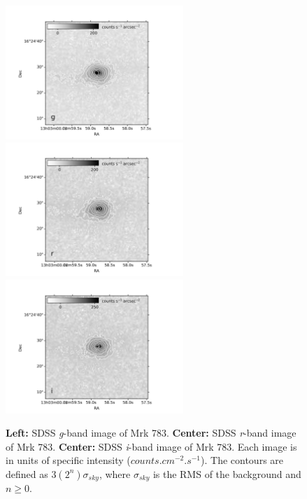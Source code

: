 \documentclass[../main.tex]{subfiles}
\begin{document}
\begin{figure}
\centering
\includegraphics[width=0.6\textwidth]{images/paper3/contours_g.jpg} \\
\includegraphics[width=0.6\textwidth]{images/paper3/contours_r.jpg} \\
\includegraphics[width=0.6\textwidth]{images/paper3/contours_i.jpg}
\caption[]{\textbf{Left:} SDSS \emph{g}-band image of Mrk 783. \textbf{Center:} SDSS \emph{r}-band image of Mrk 783. \textbf{Center:} SDSS \emph{i}-band image of Mrk 783. Each image is in units of specific intensity ($\si{counts.cm^{-2}.s^{-1}}$). The contours are defined as $3(2^n)\sigma_{sky}$, where $\sigma_{sky}$ is the RMS of the background and $n\ge 0$. }
\label{fig:contours}
\end{figure}
\end{document}
